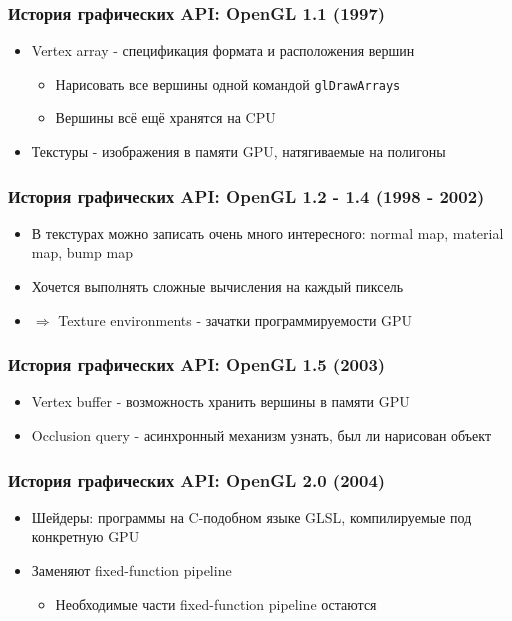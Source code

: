 \documentclass{beamer}
\begin{document}
\begin{frame}[fragile]
\frametitle{История графических API: OpenGL 1.1 (1997)}
\begin{itemize}
\item Vertex array - спецификация формата и расположения вершин
\begin{itemize}
\item Нарисовать все вершины одной командой \verb|glDrawArrays|
\item Вершины всё ещё хранятся на CPU
\end{itemize}
\pause
\item Текстуры - изображения в памяти GPU, натягиваемые на полигоны
\end{itemize}
\end{frame}

\begin{frame}
\frametitle{История графических API: OpenGL 1.2 - 1.4 (1998 - 2002)}
\begin{itemize}
\item В текстурах можно записать очень много интересного: normal map, material map, bump map
\item Хочется выполнять сложные вычисления на каждый пиксель
\item $\Longrightarrow$ Texture environments - зачатки программируемости GPU
\end{itemize}
\end{frame}

\begin{frame}
\frametitle{История графических API: OpenGL 1.5 (2003)}
\begin{itemize}
\item Vertex buffer - возможность хранить вершины в памяти GPU
\pause
\item Occlusion query - асинхронный механизм узнать, был ли нарисован объект
\end{itemize}
\end{frame}

\begin{frame}
\frametitle{История графических API: OpenGL 2.0 (2004)}
\begin{itemize}
\item Шейдеры: программы на C-подобном языке GLSL, компилируемые под конкретную GPU
\item Заменяют fixed-function pipeline
\begin{itemize}
\item Необходимые части fixed-function pipeline остаются
\end{itemize}
\end{itemize}
\end{frame}
\end{document}
